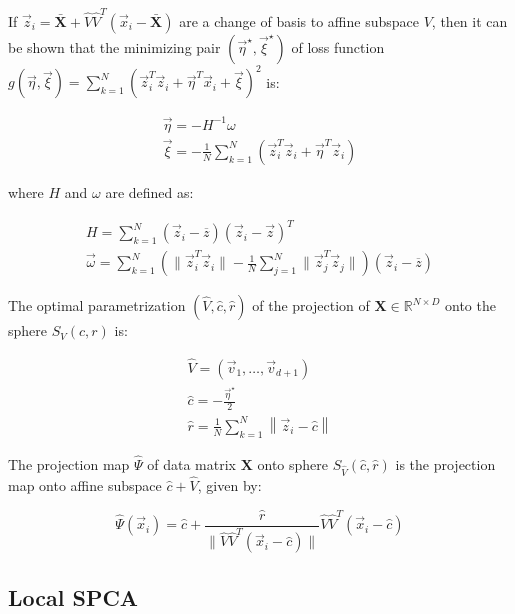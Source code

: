 \documentclass[]{article}
\begin{document}
If
\(\vec{z}_i = \bar{\mathbf{X}} + \hat{V}\hat{V}^T(\vec{x}_i - \bar{\mathbf{X}})\)
are a change of basis to affine subspace \(V\), then it can be shown
that the minimizing pair \((\vec{\eta}^\star, \vec{\xi}^\star)\) of loss
function
\(g(\vec{\eta}, \vec{\xi}) = \sum_{k = 1}^N(\vec{z}_i^T \vec{z}_i + \vec{\eta}^T \vec{x}_i + \vec{\xi})^2\)
is:

\[
\begin{gathered}
\vec{\eta} = -H^{-1}\omega \\
\vec{\xi} = -\frac{1}{N} \sum_{k=1}^N(\vec{z}_i^T \vec{z}_i + \vec{\eta}^T\vec{z}_i)
\end{gathered}
\]

where \(H\) and \(\omega\) are defined as:

\[
\begin{gathered}
H = \sum_{k = 1}^N (\vec{z}_i - \overline{z})(\vec{z}_i - \vec{z})^T \\
\vec{\omega} = \sum_{k=1}^N \left( \|\vec{z}_i^T\vec{z}_i\| - \frac{1}{N}\sum_{j=1}^N\|\vec{z}_j^T\vec{z}_j\| \right) (\vec{z}_i - \overline{z})
\end{gathered}
\]

The optimal parametrization \((\hat{V}, \hat{c}, \hat{r})\) of the
projection of \(\mathbf{X} \in \mathbb{R}^{N \times D}\) onto the sphere
\(S_V(c, r)\) is:

\[
\begin{gathered}
\hat{V} = (\vec{v}_1, \dots, \vec{v}_{d + 1}) \\
\hat{c} = -\frac{\vec{\eta}^\star}{2}  \\
\hat{r} = \frac{1}{N} \sum_{k = 1}^N \left\|\vec{z}_i - \hat{c} \right\|
\end{gathered}
\]

The projection map \(\hat{\Psi}\) of data matrix \(\mathbf{X}\) onto
sphere \(S_{\hat{V}}(\hat{c}, \hat{r})\) is the projection map onto
affine subspace \(\hat{c} + \hat{V}\), given by:

\[
\hat{\Psi}(\vec{x}_i) = \hat{c} + \frac{\hat{r}}{\| \hat{V}\hat{V}^T (\vec{x}_i - \hat{c}) \|}\hat{V}\hat{V}^T(\vec{x}_i - \hat{c})
\]

\subsection{Local SPCA}
\end{document}
